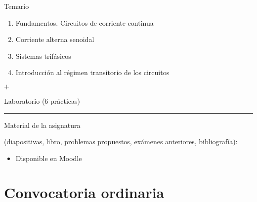 \documentclass[aspectratio=169, usenames,svgnames,dvipsnames]{beamer}
\begin{document}
\begin{frame}{Temario}
    \begin{enumerate}
        \item Fundamentos. Circuitos de corriente continua
        \vspace{1mm}
        \item Corriente alterna senoidal
        \vspace{1mm}
        \item Sistemas trifásicos
        \vspace{1mm}
        \item Introducción al régimen transitorio de los circuitos
    \end{enumerate}
    \hspace{7mm} $+$
    
    \hspace{7mm} Laboratorio (6 prácticas)

    \vspace{1mm}

    \noindent\rule{\textwidth}{0.5pt}
    
    \vspace{3mm}
    
    \alert{Material de la asignatura}
    
    (diapositivas, libro, problemas propuestos, exámenes anteriores, bibliografía): 
    
    \begin{itemize}
        \addtolength{\itemsep}{10mm}
        \item Disponible en Moodle
    \end{itemize}

\end{frame}


\section*{Convocatoria ordinaria}
\end{document}
